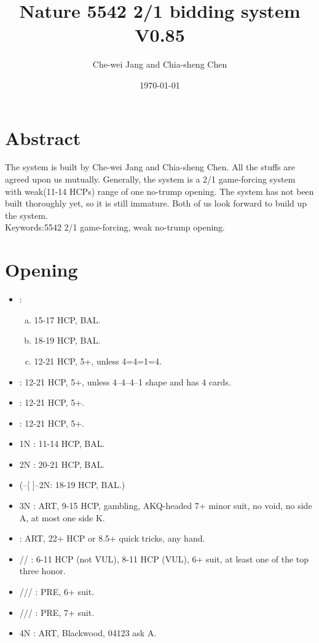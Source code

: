 \documentclass[12pt,twoside,a5paper]{report}%
\begin{document}
\title{Nature 5542 2/1 bidding system V0.85}
\author{Che-wei Jang and Chia-sheng Chen}
\date{\today}
\maketitle
\tableofcontents


\chapter*{Abstract}
	The system is built by Che-wei Jang and Chia-sheng Chen. All the stuffs are agreed upon us mutually. Generally, the system is a 2/1 game-forcing system with weak(11-14 HCPs) range of one no-trump opening.
	The system has not been built thoroughly yet, so it is still immature. Both of us look forward to build up the system.\\
	Keywords:5542 2/1 game-forcing, weak no-trump opening.
\chapter*{Opening}
	\begin{itemize}
	\renewcommand{\labelitemi}{}
		\item {}: 
		\begin{enumerate}[(a)]
			\item 15-17 HCP, BAL.
			\item 18-19 HCP, BAL.
			\item 12-21 HCP, 5+\cl{}, unless 4=4=1=4.
		\end{enumerate}
		\item {} : 12-21 HCP, 5+\di{}, unless 4--4--4--1 shape and \di{} has 4 cards.
		\item {} : 12-21 HCP, 5+\he{}.
		\item {} : 12-21 HCP, 5+\sp{}.
		\item 1N : 11-14 HCP, BAL.
		\item 2N : 20-21 HCP, BAL.
		\item (--[ ]--2N: 18-19 HCP, BAL.)
		\item 3N : ART, 9-15 HCP, gambling, AKQ-headed 7+ minor suit, no void, no side A, at most one side K.
		\item {} : ART, 22+ HCP or 8.5+ quick tricks, any hand.
		\item {}/\he{}/\sp{} : 6-11 HCP (not VUL), 8-11 HCP (VUL), 6+ suit, at least one of the top three honor.
		\item {}/\di{}/\he{}/\sp{} : PRE, 6+ suit.
		\item {}/\di{}/\he{}/\sp{} : PRE, 7+ suit.
		\item 4N : ART, Blackwood, 04123 ask A.
	\end{itemize}
\end{document}
